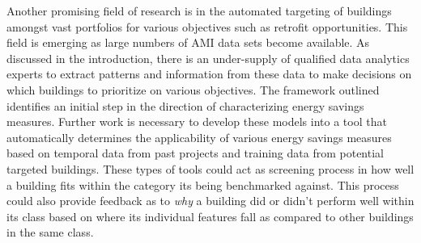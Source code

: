 Another promising field of research is in the automated targeting of buildings amongst vast portfolios for various objectives such as retrofit opportunities. This field is emerging as large numbers of AMI data sets become available. As discussed in the introduction, there is an under-supply of qualified data analytics experts to extract patterns and information from these data to make decisions on which buildings to prioritize on various objectives. The framework outlined identifies an initial step in the direction of characterizing energy savings measures. Further work is necessary to develop these models into a tool that automatically determines the applicability of various energy savings measures based on temporal data from past projects and training data from potential targeted buildings. These types of tools could act as screening process in how well a building fits within the category its being benchmarked against. This process could also provide feedback as to \emph{why} a building did or didn't perform well within its class based on where its individual features fall as compared to other buildings in the same class. 

